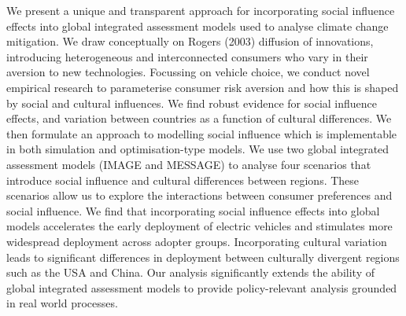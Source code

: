 We present a unique and transparent approach for incorporating social influence effects into global integrated assessment models used to analyse climate change mitigation. We draw conceptually on Rogers (2003) diffusion of innovations, introducing heterogeneous and interconnected consumers who vary in their aversion to new technologies. Focussing on vehicle choice, we conduct novel empirical research to parameterise consumer risk aversion and how this is shaped by social and cultural influences. We find robust evidence for social influence effects, and variation between countries as a function of cultural differences. We then formulate an approach to modelling social influence which is implementable in both simulation and optimisation-type models. We use two global integrated assessment models (IMAGE and MESSAGE) to analyse four scenarios that introduce social influence and cultural differences between regions. These scenarios allow us to explore the interactions between consumer preferences and social influence. We find that incorporating social influence effects into global models accelerates the early deployment of electric vehicles and stimulates more widespread deployment across adopter groups. Incorporating cultural variation leads to significant differences in deployment between culturally divergent regions such as the USA and China. Our analysis significantly extends the ability of global integrated assessment models to provide policy-relevant analysis grounded in real world processes.
